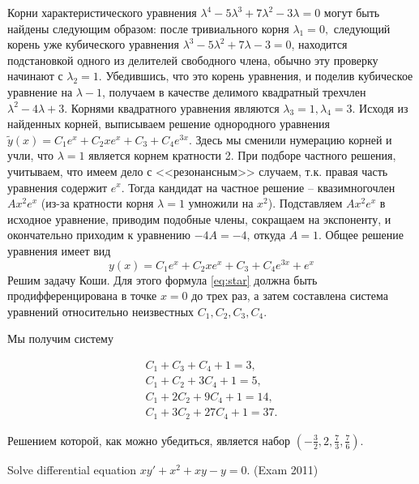 \begin{solution}
Корни характеристического уравнения $\lambda ^{4} -5\lambda ^{3} +7\lambda ^{2} -3\lambda =0$ могут быть найдены следующим образом: после тривиального корня $\lambda _{1} =0, $ следующий корень уже кубического уравнения $\lambda ^{3} -5\lambda ^{2} +7\lambda -3=0$, находится подстановкой одного из делителей свободного члена, обычно эту проверку начинают с $\lambda _{2} =1$. Убедившись, что это корень уравнения, и поделив кубическое уравнение на $\lambda -1$, получаем в качестве делимого квадратный трехчлен $\lambda ^{2} -4\lambda +3$. Корнями квадратного уравнения являются $\lambda _{3} =1, \lambda _{4} =3$. Исходя из найденных корней, выписываем решение однородного уравнения $\tilde{y}(x)=C_{1} e^{x} +C_{2} xe^{x} +C_{3} +C_{4} e^{3x} $. Здесь мы сменили нумерацию корней и учли, что $\lambda =1$ является корнем кратности 2. При подборе частного решения, учитываем, что имеем дело с <<резонансным>> случаем, т.к. правая часть уравнения  содержит $e^{x} $. Тогда кандидат на частное решение -- квазимногочлен $Ax^{2} e^{x} $ (из-за кратности корня $\lambda =1$ умножили на $x^{2} $). Подставляем $Ax^{2} e^{x} $ в исходное уравнение, приводим подобные члены, сокращаем на экспоненту, и окончательно приходим к уравнению $-4A=-4$, откуда $A=1$. Общее решение уравнения  имеет вид 
\begin{equation} \label{eq:star}  
y(x)=C_{1} e^{x} +C_{2} xe^{x} +C_{3} +C_{4} e^{3x} +e^{x}
\end{equation} 
Решим задачу Коши. Для этого формула \ref{eq:star} должна быть продифференцирована в точке $x=0$ до трех раз, а затем составлена система уравнений относительно неизвестных $C_{1} , C_{2} , C_{3} , C_{4} $.

Мы получим систему

\[\begin{array}{c} {C_{1} +C_{3} +C_{4} +1=3,} \\ {C_{1} +C_{2} +3C_{4} +1=5,} \\ {C_{1} +2C_{2} +9C_{4} +1=14,} \\ {C_{1} +3C_{2} +27C_{4} +1=37.} \end{array}\] 

Решением которой, как можно убедиться, является набор $(-\frac{3}{2} ,2,\frac{7}{3} ,\frac{7}{6} )$.
\end{solution}

\begin{problem}
Solve differential equation $xy'+x^{2} +xy-y=0$. (Exam 2011)
\end{problem}

